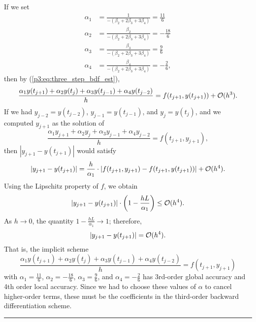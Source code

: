 \documentclass{homework}
\begin{document}
	If we set 
	\begin{align}
		\alpha_1 &= \frac{1}{-(\beta_2 + 2\beta_3 + 3\beta_4)} = \frac{11}{6} \\
		\alpha_2 &= \frac{\beta_2}{-(\beta_2 + 2\beta_3 + 3\beta_4)} = -\frac{18}{6}\\
		\alpha_3 &= \frac{\beta_3}{-(\beta_2 + 2\beta_3 + 3\beta_4)} = \frac{9}{6}\\
		\alpha_4 &= \frac{\beta_4}{-(\beta_2 + 2\beta_3 + 3\beta_4)} = -\frac{2}{6},
	\end{align}
	then by (\ref{p3:eq:three_step_bdf_est}),
	\begin{equation}
		\frac{\alpha_1y(t_{j+1}) +\alpha_2y(t_j) +\alpha_3y(t_{j-1}) + \alpha_4y(t_{j-2})}{h} = f(t_{j+1},y(t_{j+1})) + \mathcal{O}(h^3).
	\end{equation}
	If we had $y_{j-2} = y(t_{j-2})$, $y_{j-1} = y(t_{j-1})$, and $y_j = y(t_j)$, and we computed $y_{j+1}$ as the solution of
	\begin{equation}
		\frac{\alpha_1y_{j+1} + \alpha_2y_j +\alpha_3y_{j-1} + \alpha_4y_{j-2}}{h} = f(t_{j+1}, y_{j+1}),
	\end{equation}
	then $|y_{j+1} - y(t_{j+1})|$ would satisfy
	\begin{equation}
		|y_{j+1} - y(t_{j+1})| = \frac{h}{\alpha_1}\cdot|f(t_{j+1}, y_{j+1}) - f(t_{j+1}, y(t_{j+1}))| + \mathcal{O}(h^4).
	\end{equation}
	Using the Lipschitz property of $f$, we obtain
	\begin{equation}
		|y_{j+1} - y(t_{j+1})|\cdot\left(1-\frac{hL}{\alpha_1}\right) \le \mathcal{O}(h^4).
	\end{equation}
	As $h\to 0$, the quantity $1-\frac{hL}{\alpha_1} \to 1$; therefore,
	\begin{equation}
		|y_{j+1} - y(t_{j+1})| = \mathcal{O}(h^4).
	\end{equation}
	That is, the implicit scheme
	\begin{equation}
		\label{p3:eq:3_step_bdf_scheme}
		\frac{\alpha_1y(t_{j+1}) + \alpha_2y(t_j) +\alpha_3y(t_{j-1}) + \alpha_4y(t_{j-2})}{h} = f(t_{j+1}, y_{j+1})
	\end{equation}
	with $\alpha_1 = \frac{11}{6}$, $\alpha_2 = -\frac{18}{6}$, $\alpha_3 = \frac{9}{6}$, and $\alpha_4 = -\frac{2}{6}$ has 3rd-order global accuracy and 4th order local accuracy. Since we had to choose these values of $\alpha$ to cancel higher-order terms, these must be the coefficients in the third-order backward differentiation scheme.
	\\
	\hrule
	
\end{document}
